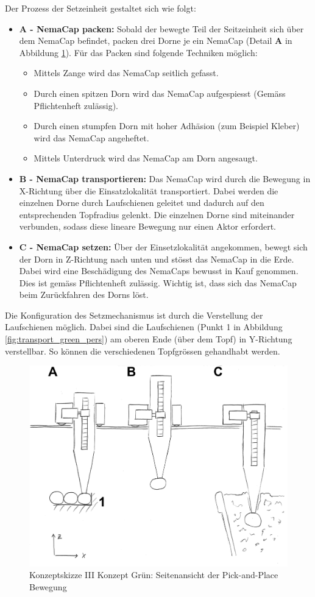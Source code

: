 Der Prozess der Setzeinheit gestaltet sich wie folgt:
\begin{itemize}
	\item \textbf{A - NemaCap packen:} Sobald der bewegte Teil der Seitzeinheit sich über dem NemaCap befindet, packen drei Dorne je ein NemaCap (Detail \textbf{A} in Abbildung \ref{fig:transport_green_side}). Für das Packen sind folgende Techniken möglich:
	\begin{itemize}
		\item Mittels Zange wird das NemaCap seitlich gefasst.
		\item Durch einen spitzen Dorn wird das NemaCap aufgespiesst (Gemäss Pflichtenheft zulässig).
		\item Durch einen stumpfen Dorn mit hoher Adhäsion (zum Beispiel Kleber) wird das NemaCap angeheftet.
		\item Mittels Unterdruck wird das NemaCap am Dorn angesaugt.
	\end{itemize} 
	\item \textbf{B - NemaCap transportieren:} Das NemaCap wird durch die Bewegung in X-Richtung über die Einsatzlokalität transportiert. Dabei werden die einzelnen Dorne durch Laufschienen geleitet und dadurch auf den entsprechenden Topfradius gelenkt. Die einzelnen Dorne sind miteinander verbunden, sodass diese lineare Bewegung nur einen Aktor erfordert.
	
	\item \textbf{C - NemaCap setzen:} 
	Über der Einsetzlokalität angekommen, bewegt sich der Dorn in Z-Richtung nach unten und stösst das NemaCap in die Erde. Dabei wird eine Beschädigung des NemaCaps bewusst in Kauf genommen. Dies ist gemäss Pflichtenheft zulässig. Wichtig ist, dass sich das NemaCap beim Zurückfahren des Dorns löst.
\end{itemize}
Die Konfiguration des Setzmechanismus ist durch die Verstellung der Laufschienen möglich. Dabei sind die Laufschienen (Punkt 1 in Abbildung \ref{fig:transport_green_pers}) am oberen Ende (über dem Topf) in Y-Richtung verstellbar. So können die verschiedenen Topfgrössen gehandhabt werden.

\begin{figure}[H]
	\includegraphics[scale=0.6]{Illustrationen/5-Konzept/green_2Dmachine_seite.jpg}
	\caption{Konzeptskizze III Konzept Grün: Seitenansicht der Pick-and-Place Bewegung}
	\label{fig:transport_green_side}
\end{figure}